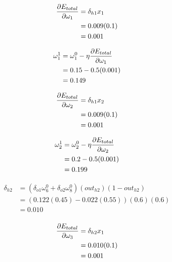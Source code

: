 \documentclass[10pt,a4paper]{article}
\begin{document}
\begin{equation}
\begin{split}
\pdv{E_{total}}{\omega_1} &= \delta_{h1}x_1\\ 
                          &= 0.009(0.1)\\
                          &= 0.001\\
\end{split}
\end{equation}

\begin{equation}
\begin{split}
\omega_1^1 &= \omega_1^0 - \eta\pdv{E_{total}}{\omega_1}\\
           &= 0.15 -0.5(0.001)\\
           &= 0.149\\
\end{split}
\end{equation}

\begin{equation}
\begin{split}
\pdv{E_{total}}{\omega_2} &= \delta_{h1}x_2\\ 
                          &= 0.009(0.1)\\
                          &= 0.001\\
\end{split}
\end{equation}

\begin{equation}
\begin{split}
\omega_2^1 &= \omega_2^0 - \eta\pdv{E_{total}}{\omega_2}\\
           &= 0.2 -0.5(0.001)\\
           &= 0.199\\
\end{split}
\end{equation}

\begin{equation}
\begin{split}
\delta_{h2} &= (\delta_{o1}\omega_6^0 + \delta_{o2}\omega_8^0)(out_{h2})(1-out_{h2})\\
&= (0.122(0.45) -0.022(0.55))(0.6)(0.6)\\
&= 0.010\\
\end{split}
\end{equation}

\begin{equation}
\begin{split}
\pdv{E_{total}}{\omega_3} &= \delta_{h2}x_1\\ 
                          &= 0.010(0.1)\\
                          &= 0.001\\
\end{split}
\end{equation}
\end{document}
